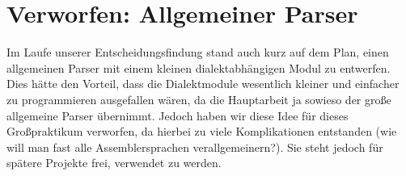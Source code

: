 \section{Verworfen: Allgemeiner Parser} Im Laufe unserer Entscheidungsfindung
stand auch kurz auf dem Plan, einen allgemeinen Parser mit einem kleinen
dialektabhängigen Modul zu entwerfen.  Dies hätte den Vorteil, dass die
Dialektmodule wesentlich kleiner und einfacher zu programmieren ausgefallen
wären, da die Hauptarbeit ja sowieso der große allgemeine Parser übernimmt.
Jedoch haben wir diese Idee für dieses Großpraktikum verworfen, da hierbei zu
viele Komplikationen entstanden (wie will man fast alle Assemblersprachen
verallgemeinern?).  Sie steht jedoch für spätere Projekte frei, verwendet zu
werden.
